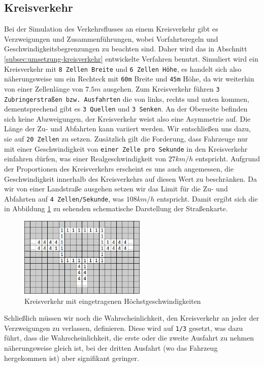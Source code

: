 \documentclass[10pt, a4paper]{article}
\begin{document}
\subsection{Kreisverkehr}
\label{subsec:kreisverkehr}
Bei der Simulation des Verkehrsflusses an einem Kreisverkehr gibt es Verzweigungen und Zusammenführungen, wobei Vorfahrtsregeln und Geschwindigkeitsbegrenzungen zu beachten sind. Daher wird das in Abschnitt \ref{subsec:umsetzung-kreisverkehr} entwickelte Verfahren benutzt. Simuliert wird ein Kreisverkehr mit \texttt{8 Zellen Breite} und \texttt{6 Zellen Höhe}, es handelt sich also näherungsweise um ein Rechteck mit \texttt{60m} Breite und \texttt{45m} Höhe, da wir weiterhin von einer Zellenlänge von $7.5m$ ausgehen. Zum Kreisverkehr führen \texttt{3 Zubringerstraßen bzw. Ausfahrten} die von links, rechts und unten kommen, dementsprechend gibt es \texttt{3 Quellen} und \texttt{3 Senken}. An der Oberseite befinden sich keine Abzweigungen, der Kreisverkehr weist also eine Asymmetrie auf. Die Länge der Zu- und Abfahrten kann variiert werden. Wir entschließen uns dazu, sie auf \texttt{20 Zellen} zu setzen. Zusätzlich gilt die Forderung, dass Fahrzeuge nur mit einer Geschwindigkeit von \texttt{einer Zelle pro Sekunde} in den Kreisverkehr einfahren dürfen, was einer Realgeschwindigkeit von $27km/h$ entspricht. Aufgrund der Proportionen des Kreisverkehrs erscheint es uns auch angemessen, die Geschwindigkeit innerhalb des Kreisverkehrs auf diesen Wert zu beschränken. Da wir von einer Landstraße ausgehen setzen wir das Limit für die Zu- und Abfahrten auf \texttt{4 Zellen/Sekunde}, was $108km/h$ entspricht. Damit ergibt sich die in Abbildung \ref{fig:roundaboutSmall} zu sehenden schematische Darstellung der Straßenkarte.

\begin{figure}[h!]
	\centering
	\includegraphics[width=6cm]{img/roundaboutSmall}
	\caption{Kreisverkehr mit eingetragenen Höchstgeschwindigkeiten}
	\label{fig:roundaboutSmall}
\end{figure}

Schließlich müssen wir noch die Wahrscheinlichkeit, den Kreisverkehr an jeder der Verzweigungen zu verlassen, definieren. Diese wird auf \texttt{1/3} gesetzt, was dazu führt, dass die Wahrscheinlichkeit, die erste oder die zweite Ausfahrt zu nehmen näherungsweise gleich ist, bei der dritten Ausfahrt (wo das Fahrzeug hergekommen ist) aber signifikant geringer.
\end{document}
